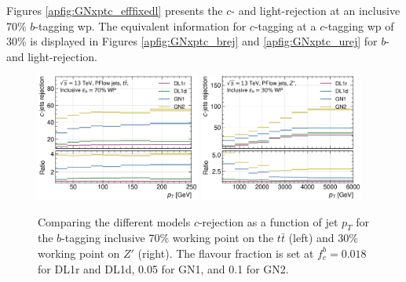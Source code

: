 Figures \ref{apfig:GNxptc_efffixedl} presents the $c$- and light-rejection at an inclusive 70\% $b$-tagging \gls{wp}. The equivalent information for $c$-tagging at a $c$-tagging \gls{wp} of 30\% is displayed in Figures \ref{apfig:GNxptc_brej} and \ref{apfig:GNxptc_urej} for $b$- and light-rejection. 
\begin{figure}[h!]
    \centering
    \includegraphics[width=0.48\textwidth]{Images/FTAG/GN/GN2/pt_plots/pt_ttbar_c_rej.png}
    \includegraphics[width=0.48\textwidth]{Images/FTAG/GN/GN2/pt_plots/pt_zp_c_rej.png}
    \caption{Comparing the different models $c$-rejection as a function of jet $p_T$ for the $b$-tagging inclusive 70\% working point on the $t\bar{t}$ (left) and 30\% working point on $Z'$ (right). The flavour fraction is set at $f^b_c = 0.018$ for DL1r and DL1d, 0.05 for GN1, and 0.1 for GN2.}
    \label{apfig:GNxptb_crej}
  \end{figure} 
  
